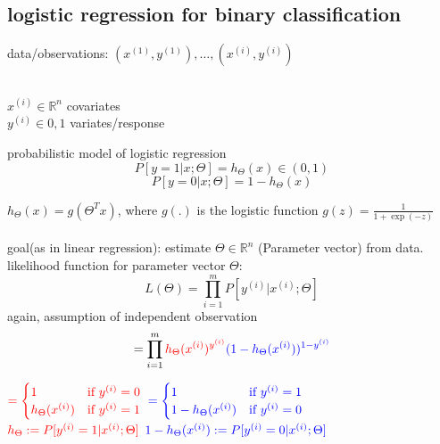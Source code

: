 \subsection*{logistic regression for binary classification}
data/observations: $(x^{(1)}, y^{(1)}), \dots , (x^{(i)}, y^{(i)})$\\\\
\begin{center}
 $x^{(i)} \in \mathbb{R}^n$ \space covariates\\
 $y^{(i)} \in {0,1}$ \space variates/response
\end{center}
probabilistic model of logistic regression
\[P[y=1|x;\Theta] = h_{\Theta}(x) \in (0,1)\]
\[P[y=0|x;\Theta] = 1-h_{\Theta}(x) \]

$h_{\Theta}(x) = g(\Theta^T x)$, where $g(.)$ is the logistic function $g(z) = \frac{1}{1+\exp(-z)}$\\\\
goal(as in linear regression): estimate $\Theta \in \mathbb{R}^n$ (Parameter vector) from data.\\
likelihood function for parameter vector $\Theta$:
\[L(\Theta) = \prod^m_{i=1} P[y^{(i)}|x^{(i)} ; \Theta]\]
again, assumption of independent observation
\[= \prod^m_{i=1} \textcolor{red}{h_{\Theta}(x^{(i)})^{y^{(i)}}} \textcolor{blue}{(1-h_{\Theta}(x^{(i)}))^{1-y^{(i)}}}\]
\begin{center}

$\textcolor{red}{=\begin{cases}1&\text{if $y^{(i)} = 0$}\\h_{\Theta}(x^{(i)})&\text{if $y^{(i)} = 1$}\end{cases}}$
$\textcolor{blue}{=\begin{cases}1&\text{if $y^{(i)} = 1$}\\1-h_{\Theta}(x^{(i)})&\text{if $y^{(i)} = 0$}\end{cases}}$\\
$\textcolor{red}{h_{\Theta} := P[y^{(i)} = 1 | x^{(i)};\Theta]}$\space\space
$\textcolor{blue}{1-h_{\Theta}(x^{(i)}) := P[y^{(i)} = 0 | x^{(i)};\Theta]}$
\end{center}

